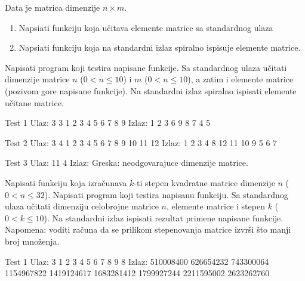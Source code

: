 \begin{Exercise}[label=325]
Data je matrica dimenzije $n \times m$.
\begin{enumerate}
\item Napsiati funkciju koja učitava elemente matrice sa standardnog ulaza
\item Napsiati funkciju koja na standardni izlaz spiralno ispisuje elemente matrice.
\end{enumerate}
Napisati program koji testira napisane funkcije. Sa standardnog
ulaza učitati dimenzije matrice $n$ ($0 < n \leq 10$) i
$m$ ($0 < n \leq 10$), a zatim i elemente matrice (pozivom gore
napisane funkcije). Na standardni izlaz spiralno ispisati elemente
učitane matrice.

\begin{miditest}
\begin{test}{Test 1}
Ulaz:  3 3
       1 2 3
       4 5 6
       7 8 9       
Izlaz: 1 2 3 6 9 8 7 4 5
\end{test}
\end{miditest}
\begin{miditest}
\begin{test}{Test 2}
Ulaz:  3 4
       1 2 3 4
       5 6 7 8
       9 10 11 12	   
Izlaz: 1 2 3 4 8 12 11 10 9 5 6 7
\end{test}
\end{miditest}

\begin{maxitest}
\begin{test}{Test 3}
Ulaz:  11 4       	   
Izlaz: Greska: neodgovarajuce dimenzije matrice.
\end{test}
\end{maxitest}
\end{Exercise}
\begin{Answer}[ref=325]
\end{Answer}

\begin{Exercise}[label=327]
Napisati funkciju koja izračunava $k$-ti stepen kvadratne
matrice dimenzije $n$ ($0 < n \leq 32$). Napisati program koji
testira napisanu funkciju. Sa standardnog ulaza učitati
dimenziju celobrojne matrice $n$, elemente matrice i stepen
$k$ ($0 < k \leq 10$). Na standardni izlaz ispisati rezultat
primene napisane funkcije. Napomena: voditi računa da se
prilikom stepenovanja matrice izvrši što manji broj
množenja.

\begin{maxitest}
\begin{test}{Test 1}
Ulaz:  3
       1 2 3
       4 5 6
       7 8 9
       8
Izlaz: 510008400 626654232 743300064
       1154967822 1419124617 1683281412
       1799927244 2211595002 2623262760
\end{test}
\end{maxitest}
\end{Exercise}
\begin{Answer}[ref=327]
\end{Answer}

